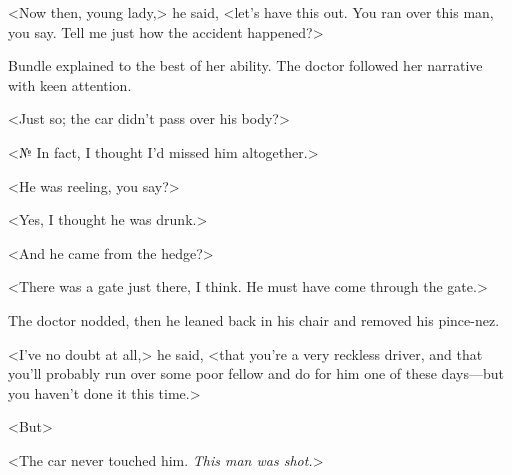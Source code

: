 <Now then, young lady,> he said, <let's have this out. You ran over this man, you say. Tell me just how the accident happened?>

Bundle explained to the best of her ability. The doctor followed her narrative with keen attention.

<Just so; the car didn't pass over his body?>

<№ In fact, I thought I'd missed him altogether.>

<He was reeling, you say?>

<Yes, I thought he was drunk.>

<And he came from the hedge?>

<There was a gate just there, I think. He must have come through the gate.>

The doctor nodded, then he leaned back in his chair and removed his pince-nez.

<I've no doubt at all,> he said, <that you're a very reckless driver, and that you'll probably run over some poor fellow and do for him one of these days—but you haven't done it this time.>

<But\longdash>

<The car never touched him. \emph{This man was shot.}>